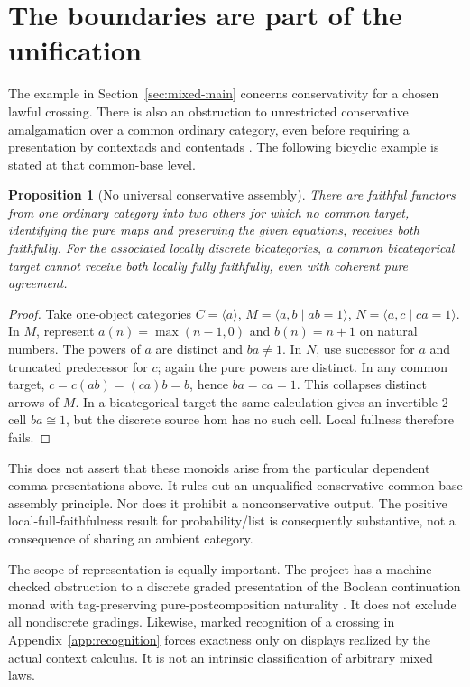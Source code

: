 \documentclass[11pt]{article}
\numberwithin{equation}{section}
\newtheorem{proposition}[theorem]{Proposition}
\theoremstyle{definition}\newtheorem{definition}[theorem]{Definition}
\begin{document}
\section{The boundaries are part of the unification}\label{sec:limits}
The example in Section~\ref{sec:mixed-main} concerns conservativity for a
chosen lawful crossing. There is also an obstruction to unrestricted
conservative amalgamation over a common ordinary category, even before
requiring a presentation by contextads and contentads \cite[Sec.~10]{U}.
The following bicyclic example is stated at that common-base level.

\begin{proposition}[No universal conservative assembly]\label{prop:bicyclic-main}
There are faithful functors from one ordinary category into two others for
which no common target, identifying the pure maps and preserving the given
equations, receives both faithfully. For the associated locally discrete
bicategories, a common bicategorical target cannot receive both locally
fully faithfully, even with coherent pure agreement.
\end{proposition}
\begin{proof}
Take one-object categories
$C=\langle a\rangle$,
$M=\langle a,b\mid ab=1\rangle$,
$N=\langle a,c\mid ca=1\rangle$.
In $M$, represent $a(n)=\max(n-1,0)$ and $b(n)=n+1$ on natural numbers.
The powers of $a$ are distinct and $ba\ne1$. In $N$, use successor for
$a$ and truncated predecessor for $c$; again the pure powers are distinct.
In any common target,
$c=c(ab)=(ca)b=b$, hence $ba=ca=1$. This collapses distinct arrows of
$M$. In a bicategorical target the same calculation gives an invertible
2-cell $ba\cong1$, but the discrete source hom has no such cell. Local
fullness therefore fails.
\end{proof}
This does not assert that these monoids arise from the particular dependent
comma presentations above. It rules out an unqualified conservative
common-base assembly principle. Nor does it prohibit a nonconservative
output. The positive local-full-faithfulness result for probability/list
is consequently substantive, not a consequence of sharing an ambient
category.

The scope of representation is equally important. The project has a
machine-checked obstruction to a discrete graded presentation of the Boolean
continuation monad with tag-preserving pure-postcomposition naturality
\cite{DiscreteObstruction}. It does not exclude all nondiscrete gradings.
Likewise, marked recognition of a crossing in Appendix~\ref{app:recognition}
forces exactness only on displays realized by the actual context calculus.
It is not an intrinsic classification of arbitrary mixed laws.
\end{document}
